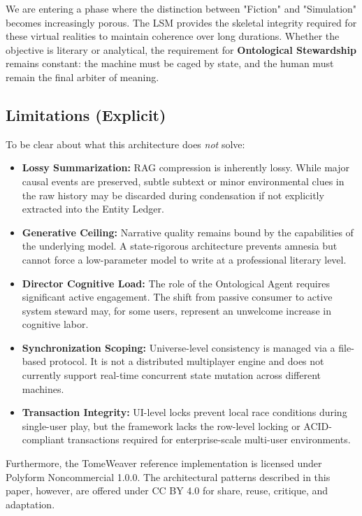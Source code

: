 \documentclass[12pt, a4paper]{article}
\begin{document}
We are entering a phase where the distinction between "Fiction" and "Simulation" becomes increasingly porous. The LSM provides the skeletal integrity required for these virtual realities to maintain coherence over long durations. Whether the objective is literary or analytical, the requirement for \textbf{Ontological Stewardship} remains constant: the machine must be caged by state, and the human must remain the final arbiter of meaning.


\subsection{Limitations (Explicit)}

To be clear about what this architecture does \textit{not} solve:

\begin{itemize}
    \item \textbf{Lossy Summarization:} RAG compression is inherently lossy. While major causal events are preserved, subtle subtext or minor environmental clues in the raw history may be discarded during condensation if not explicitly extracted into the Entity Ledger.

    \item \textbf{Generative Ceiling:} Narrative quality remains bound by the capabilities of the underlying model. A state-rigorous architecture prevents amnesia but cannot force a low-parameter model to write at a professional literary level.

    \item \textbf{Director Cognitive Load:} The role of the Ontological Agent requires significant active engagement. The shift from passive consumer to active system steward may, for some users, represent an unwelcome increase in cognitive labor.

    \item \textbf{Synchronization Scoping:} Universe-level consistency is managed via a file-based protocol. It is not a distributed multiplayer engine and does not currently support real-time concurrent state mutation across different machines.

    \item \textbf{Transaction Integrity:} UI-level locks prevent local race conditions during single-user play, but the framework lacks the row-level locking or ACID-compliant transactions required for enterprise-scale multi-user environments.
\end{itemize}

Furthermore, the TomeWeaver reference implementation is licensed under Polyform Noncommercial 1.0.0. The architectural patterns described in this paper, however, are offered under CC BY 4.0 for share, reuse, critique, and adaptation.
\end{document}

